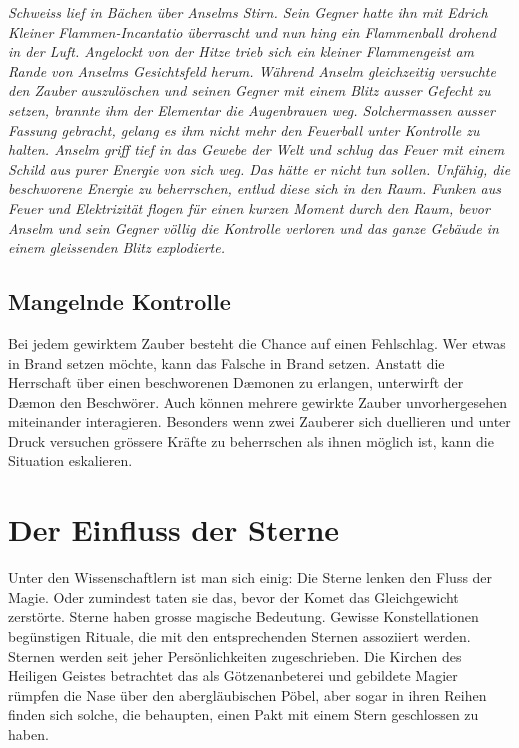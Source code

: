 \documentclass[12pt,twoside,twocolumn,openany]{book}
\begin{document}
\begin{quotebox}
	\textit{Schweiss lief in Bächen über Anselms Stirn. Sein Gegner hatte ihn mit Edrich Kleiner Flammen-Incantatio überrascht und nun hing ein Flammenball drohend in der Luft. Angelockt von der Hitze trieb sich ein kleiner Flammengeist am Rande von Anselms Gesichtsfeld herum. Während Anselm gleichzeitig versuchte den Zauber auszulöschen und seinen Gegner mit einem Blitz ausser Gefecht zu setzen, brannte ihm der Elementar die Augenbrauen weg. Solchermassen ausser Fassung gebracht, gelang es ihm nicht mehr den Feuerball unter Kontrolle zu halten. Anselm griff tief in das Gewebe der Welt und schlug das Feuer mit einem Schild aus purer Energie von sich weg. Das hätte er nicht tun sollen. Unfähig, die beschworene Energie zu beherrschen, entlud diese sich in den Raum. Funken aus Feuer und Elektrizität flogen für einen kurzen Moment durch den Raum, bevor Anselm und sein Gegner völlig die Kontrolle verloren und das ganze Gebäude in einem gleissenden Blitz explodierte.
	}
\end{quotebox}

\subsection{Mangelnde Kontrolle}
Bei jedem gewirktem Zauber besteht die Chance auf einen Fehlschlag. Wer etwas in Brand setzen möchte, kann das Falsche in Brand setzen. Anstatt die Herrschaft über einen beschworenen D\ae monen zu erlangen, unterwirft der D\ae mon den Beschwörer. Auch können mehrere gewirkte Zauber unvorhergesehen miteinander interagieren.
Besonders wenn zwei Zauberer sich duellieren und unter Druck versuchen grössere Kräfte zu beherrschen als ihnen möglich ist, kann die Situation eskalieren.

\section{Der Einfluss der Sterne}
Unter den Wissenschaftlern ist man sich einig: Die Sterne lenken den Fluss der Magie. Oder zumindest taten sie das, bevor der Komet das Gleichgewicht zerstörte. Sterne haben grosse magische Bedeutung. Gewisse Konstellationen begünstigen Rituale, die mit den entsprechenden Sternen assoziiert werden. Sternen werden seit jeher Persönlichkeiten zugeschrieben. Die Kirchen des Heiligen Geistes betrachtet das als Götzenanbeterei und gebildete Magier rümpfen die Nase über den abergläubischen Pöbel, aber sogar in ihren Reihen finden sich solche, die behaupten, einen Pakt mit einem Stern geschlossen zu haben. 
\end{document}
